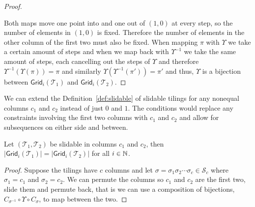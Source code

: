 \begin{proof}
\begin{center}
\begin{tikzpicture}[scale=0.75]
\end{tikzpicture}
\end{center}
Both maps move one point into and one out of $(1,0)$ at every step, so the number of elements in $(1,0)$ is fixed. Therefore the number of elements in the other column of the first two must also be fixed. When mapping $\pi$ with $\Upsilon$ we take a certain amount of steps and when we map back with $\Upsilon^{-1}$ we take the same amount of steps, each cancelling out the steps of $\Upsilon$ and therefore $\Upsilon^{-1}(\Upsilon(\pi)) = \pi$ and similarly $\Upsilon\left(\Upsilon^{-1}(\pi')\right) = \pi'$ and thus, $\Upsilon$ is a bijection between $\textsf{Grid}_i(\mathcal{T}_1)$ and $\textsf{Grid}_i(\mathcal{T}_2)$.
\end{proof}

We can extend the Definition~\ref{def:slidable} of slidable tilings for any nonequal columns $c_1$ and $c_2$ instead of just $0$ and $1$. The conditions would replace any constraints involving the first two columns with $c_1$ and $c_2$ and allow for subsequences on either side and between.

\begin{proposition}
Let $(\mathcal{T}_1,\mathcal{T}_2)$ be slidable in columns $c_1$ and $c_2$, then $|\textsf{Grid}_i(\mathcal{T}_1)| = |\textsf{Grid}_i(\mathcal{T}_2)|$ for all $i\in\N$.
\end{proposition}
\begin{proof}
Suppose the tilings have $c$ columns and let $\sigma = \sigma_1\sigma_2 \cdots \sigma_c \in \mathcal{S}_c$ where $\sigma_1 = c_1$ and $\sigma_2 = c_2$. We can permute the columns so $c_1$ and $c_2$ are the first two, slide them and permute back, that is we can use a composition of bijections, $C_{\sigma^{-1}} \circ \Upsilon \circ C_\sigma$, to map between the two.
\end{proof}